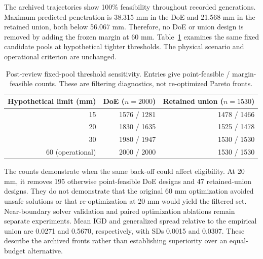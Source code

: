 The archived trajectories show 100\% feasibility throughout recorded generations. Maximum predicted penetration is 38.315 mm in the DoE and 21.568 mm in the retained union, both below 56.067 mm. Therefore, no DoE or union design is removed by adding the frozen margin at 60 mm. Table~\ref{tab:threshold} examines the same fixed candidate pools at hypothetical tighter thresholds. The physical scenario and operational criterion are unchanged.
\begin{table}[htbp]\centering\small
\caption{Post-review fixed-pool threshold sensitivity. Entries give point-feasible / margin-feasible counts. These are filtering diagnostics, not re-optimized Pareto fronts.}\label{tab:threshold}
\begin{tabular}{@{}rrr@{}}\toprule
Hypothetical limit (mm)&DoE ($n=2000$)&Retained union ($n=1530$)\\\midrule
15&1576 / 1281&1478 / 1466\\
20&1830 / 1635&1525 / 1478\\
30&1980 / 1947&1530 / 1530\\
60 (operational)&2000 / 2000&1530 / 1530\\\bottomrule
\end{tabular}\end{table}
The counts demonstrate when the same back-off could affect eligibility. At 20 mm, it removes 195 otherwise point-feasible DoE designs and 47 retained-union designs. They do not demonstrate that the original 60 mm optimization avoided unsafe solutions or that re-optimization at 20 mm would yield the filtered set. Near-boundary solver validation and paired optimization ablations remain separate experiments. Mean IGD and generalized spread relative to the empirical union are 0.0271 and 0.5670, respectively, with SDs 0.0015 and 0.0307. These describe the archived fronts rather than establishing superiority over an equal-budget alternative.

